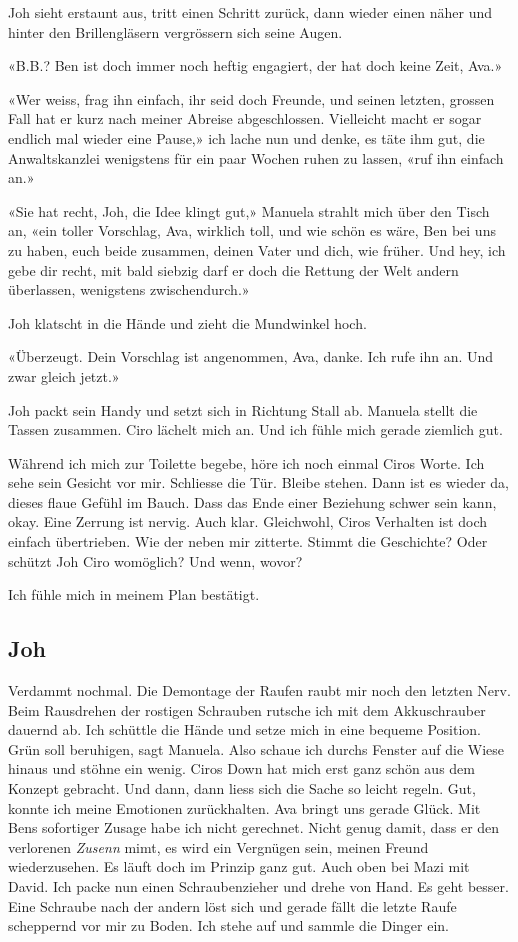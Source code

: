 Joh sieht erstaunt aus, tritt einen Schritt zurück, dann wieder einen
näher und hinter den Brillengläsern vergrössern sich seine Augen.

«B.B.? Ben ist doch immer noch heftig engagiert, der hat doch keine
Zeit, Ava.»

«Wer weiss, frag ihn einfach, ihr seid doch Freunde, und seinen letzten,
grossen Fall hat er kurz nach meiner Abreise abgeschlossen. Vielleicht
macht er sogar endlich mal wieder eine Pause,» ich lache nun und denke,
es täte ihm gut, die Anwaltskanzlei wenigstens für ein paar Wochen ruhen
zu lassen, «ruf ihn einfach an.»

«Sie hat recht, Joh, die Idee klingt gut,» Manuela strahlt mich über den
Tisch an, «ein toller Vorschlag, Ava, wirklich toll, und wie schön es 
wäre, Ben bei uns zu haben, euch beide zusammen, deinen Vater und dich,
wie früher. Und hey, ich gebe dir recht, mit bald siebzig darf er doch
die Rettung der Welt andern überlassen, wenigstens zwischendurch.»

Joh klatscht in die Hände und zieht die Mundwinkel hoch.

«Überzeugt. Dein Vorschlag ist angenommen, Ava, danke. Ich rufe ihn an.
Und zwar gleich jetzt.»

Joh packt sein Handy und setzt sich in Richtung Stall ab. Manuela stellt
die Tassen zusammen. Ciro lächelt mich an. Und ich fühle mich gerade
ziemlich gut.

Während ich mich zur Toilette begebe, höre ich noch einmal Ciros Worte.
Ich sehe sein Gesicht vor mir. Schliesse die Tür. Bleibe stehen. Dann
ist es wieder da, dieses flaue Gefühl im Bauch. Dass das Ende einer
Beziehung schwer sein kann, okay. Eine Zerrung ist nervig. Auch klar.
Gleichwohl, Ciros Verhalten ist doch einfach übertrieben. Wie der neben mir
zitterte. Stimmt die Geschichte? Oder schützt Joh Ciro womöglich? Und
wenn, wovor?

Ich fühle mich in meinem Plan bestätigt.

\subsection{Joh}

Verdammt nochmal. Die Demontage der Raufen raubt mir noch den letzten
Nerv. Beim Rausdrehen der rostigen Schrauben rutsche ich mit dem
Akkuschrauber dauernd ab. Ich schüttle die Hände und setze mich in eine
bequeme Position. Grün soll beruhigen, sagt Manuela. Also schaue ich
durchs Fenster auf die Wiese hinaus und stöhne ein wenig. Ciros Down hat mich erst ganz
schön aus dem Konzept gebracht. Und dann, dann liess sich die Sache so
leicht regeln. Gut, konnte ich meine Emotionen zurückhalten. 
Ava bringt uns gerade Glück. Mit Bens sofortiger Zusage habe ich nicht gerechnet.
Nicht genug damit, dass er den verlorenen \emph{Zusenn} mimt, es wird
ein Vergnügen sein, meinen Freund wiederzusehen. Es läuft doch im
Prinzip ganz gut. Auch oben bei Mazi mit David.
Ich packe nun einen Schraubenzieher und drehe von Hand. Es geht besser.
Eine Schraube nach der andern löst sich und gerade fällt die letzte
Raufe scheppernd vor mir zu Boden. Ich stehe auf und sammle die Dinger
ein.

